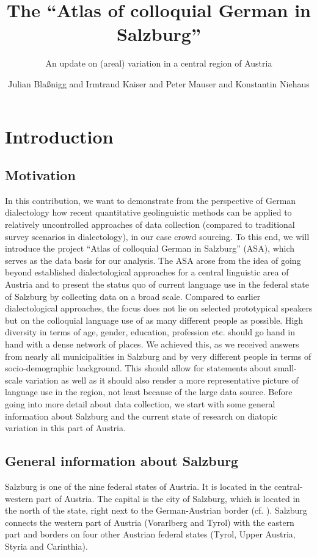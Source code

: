 \documentclass[output=paper,colorlinks, citecolor=brown]{langscibook}
\author{Julian Blaßnigg\affiliation{University of Salzburg} and Irmtraud Kaiser\affiliation{University of Salzburg} and Peter Mauser\affiliation{University of Salzburg} and Konstantin Niehaus\affiliation{University of Salzburg}}
\title{The ``Atlas of colloquial German in Salzburg''}
\subtitle{An update on (areal) variation in a central region of Austria}
\begin{document}
\maketitle
\label{chap:blassnigg}
\graphicspath{{figures/blaßnigg}}


\section{Introduction} \label{sec:blaßnigg:1}
\subsection{Motivation} \label{sec:blaßnigg:1.1}

In this contribution, we want to demonstrate from the perspective of German dialectology how recent quantitative geolinguistic methods can be applied to relatively uncontrolled approaches of data collection (compared to traditional survey scenarios in dialectology), in our case crowd sourcing. To this end, we will introduce the project ``Atlas of colloquial German in Salzburg'' (ASA), which serves as the data basis for our analysis. The ASA arose from the idea of going beyond established dialectological approaches for a central linguistic area of Austria and to present the status quo of current language use in the federal state of Salzburg by collecting data on a broad scale. Compared to earlier dialectological approaches, the focus does not lie on selected prototypical speakers but on the colloquial language use of as many different people as possible. High diversity in terms of age, gender, education, profession etc. should go hand in hand with a dense network of places. We achieved this, as we received answers from nearly all municipalities in Salzburg and by very different people in terms of socio-demographic background. This should allow for statements about small-scale variation as well as it should also render a more representative picture of language use in the region, not least because of the large data source. Before going into more detail about data collection, we start with some general information about Salzburg and the current state of research on diatopic variation in this part of Austria.

\subsection{General information about Salzburg} \label{sec:blaßnigg:1.2}

Salzburg is one of the nine federal states of Austria. It is located in the central-western part of Austria. The capital is the city of Salzburg, which is located in the north of the state, right next to the German-Austrian border (cf. ). Salzburg connects the western part of Austria (Vorarlberg and Tyrol) with the eastern part and borders on four other Austrian federal states (Tyrol, Upper Austria, Styria and Carinthia). 
  
\end{document}
